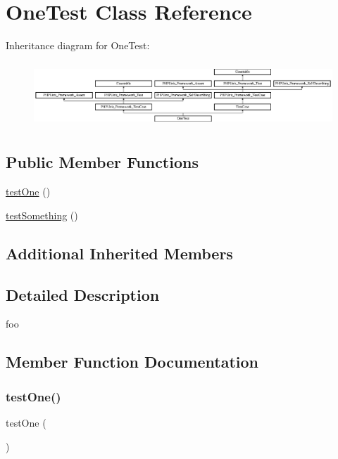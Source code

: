 \hypertarget{class_one_test}{}\section{One\+Test Class Reference}
\label{class_one_test}
Inheritance diagram for One\+Test\+:\begin{figure}[H]
\begin{center}
\leavevmode
\includegraphics[height=2.477876cm]{class_one_test}
\end{center}
\end{figure}
\subsection*{Public Member Functions}
\begin{DoxyCompactItemize}
\item 
\mbox{\hyperlink{class_one_test_afbf3ff88b322c6a7197ce02297cd23a0}{test\+One}} ()
\item 
\mbox{\hyperlink{class_one_test_a0fc4e17369bc9607ebdd850d9eda8167}{test\+Something}} ()
\end{DoxyCompactItemize}
\subsection*{Additional Inherited Members}


\subsection{Detailed Description}
foo 

\subsection{Member Function Documentation}
\mbox{\label{class_one_test_afbf3ff88b322c6a7197ce02297cd23a0}} 
\subsubsection{\texorpdfstring{test\+One()}{testOne()}}
{\footnotesize\ttfamily test\+One (\begin{DoxyParamCaption}{ }\end{DoxyParamCaption})}

